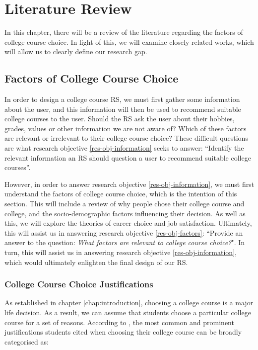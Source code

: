 \chapter{Literature Review}
\label{chap:literature-review}

In this chapter, there will be a review of the literature regarding the factors of college course choice.
In light of this, we will examine closely-related works,
which will allow us to clearly define our research gap.

\section{Factors of College Course Choice}
\label{sec:factors}

In order to design a college course RS, we must first gather some information about the user,
and this information will then be used to recommend suitable college courses to the user.
Should the RS ask the user about their hobbies, grades, values or other information we are not aware of?
Which of these factors are relevant or irrelevant to their college course choice?
These difficult questions are what research objective \ref{res-obj-information} seeks to answer:
``Identify the relevant information an RS should question a user to recommend suitable college courses''.

However, in order to answer research objective \ref{res-obj-information}, 
we must first understand the factors of college course choice, which is the intention of this section.
This will include a review of why people chose their college course and college,
and the socio-demographic factors influencing their decision.
As well as this, we will explore the theories of career choice
and job satisfaction.
Ultimately, this will assist us in answering research objective \ref{res-obj-factors}:
``Provide an answer to the question: \emph{What factors are relevant to college course choice?}".
In turn, this will assist us in answering research objective \ref{res-obj-information},
which would ultimately enlighten the final design of our RS.

\subsection{College Course Choice Justifications}
\label{sec:college-course-justifications}

As established in chapter \ref{chap:introduction}, choosing a college course is a major life decision.
As a result, we can assume that students choose a particular college course for a set of reasons.
According to \cite{matthews2024students, gillis2021choosing, mullen2011degrees}, the most common and prominent justifications students cited when
choosing their college course can be broadly categorised as:

